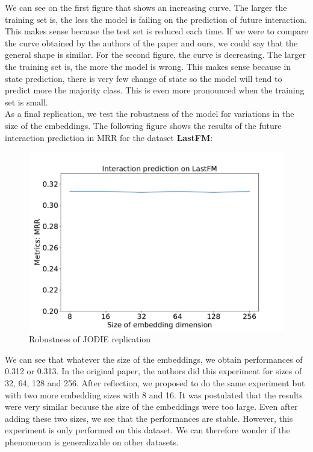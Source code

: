 
We can see on the first figure that shows an increasing curve. The larger the training set is, the less the model is failing on the prediction of future interaction. This makes sense because the test set is reduced each time. If we were to compare the curve obtained by the authors of the paper and ours, we could say that the general shape is similar.
For the second figure, the curve is decreasing. The larger the training set is, the more the model is wrong. This makes sense because in state prediction, there is very few change of state so the model will tend to predict more the majority class. This is even more pronounced when the training set is small.\\

As a final replication, we test the robustness of the model for variations in the size of the embeddings. The following figure shows the results of the future interaction prediction in MRR for the dataset \textbf{LastFM}: 
\begin{figure}[H]
    \centering
    \includegraphics[scale = 0.35]{image/lastfm.pdf}
    \caption{Robustness of JODIE replication}
\end{figure}
We can see that whatever the size of the embeddings, we obtain performances of 0.312 or 0.313. In the original paper, the authors did this experiment for sizes of 32, 64, 128 and 256. After reflection, we proposed to do the same experiment but with two more embedding sizes with 8 and 16. It was postulated that the results were very similar because the size of the embeddings were too large. Even after adding these two sizes, we see that the performances are stable. However, this experiment is only performed on this dataset. We can therefore wonder if the phenomenon is generalizable on other datasets.



